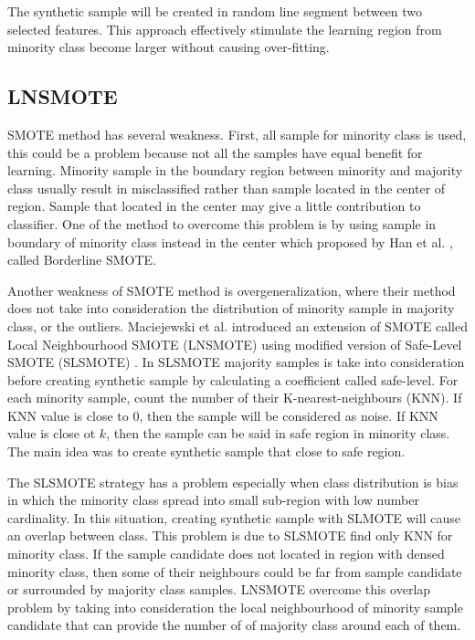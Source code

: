 \documentclass[conference,compsoc,a4paper,twocolumn,final]{IEEEtran}
\begin{document}
The synthetic sample will be created in random line segment between two
selected features.
This approach effectively stimulate the learning region from minority class
become larger without causing over-fitting.

\subsection{LNSMOTE}
\label{subsection:lnsmote}

SMOTE method has several weakness.
First, all sample for minority class is used, this could be a problem because
not all the samples have equal benefit for learning.
Minority sample in the boundary region between minority and majority class
usually result in misclassified rather than sample located in the center of
region.
Sample that located in the center may give a little contribution to classifier.
One of the method to overcome this problem is by using sample in boundary of
minority class instead in the center which proposed by Han et al.
\cite{han2005borderline}, called Borderline SMOTE.

Another weakness of SMOTE method is overgeneralization, where their method does
not take into consideration the distribution of minority sample in majority
class, or the outliers.
Maciejewski et al. introduced an extension of SMOTE called Local Neighbourhood
SMOTE (LNSMOTE) \cite{maciejewski2011local}
using modified version of Safe-Level SMOTE (SLSMOTE)
\cite{bunkhumpornpat2009safe}.
In SLSMOTE majority samples is take into consideration before creating
synthetic sample by calculating a coefficient called safe-level.
For each minority sample, count the number of their K-nearest-neighbours (KNN).
If KNN value is close to 0, then the sample will be considered as noise.
If KNN value is close ot $k$, then the sample can be said in safe region in
minority class.
The main idea was to create synthetic sample that close to safe region.

The SLSMOTE strategy has a problem especially when class distribution is bias
in which the minority class spread into small sub-region with low number
cardinality.
In this situation, creating synthetic sample with SLMOTE will cause an overlap
between class.
This problem is due to SLSMOTE find only KNN for minority class.
If the sample candidate does not located in region with densed minority class,
then some of their neighbours could be far from sample candidate or surrounded
by majority class samples.
LNSMOTE overcome this overlap problem by taking into consideration the local
neighbourhood of minority sample candidate that can provide the number of of
majority class around each of them.
\end{document}
